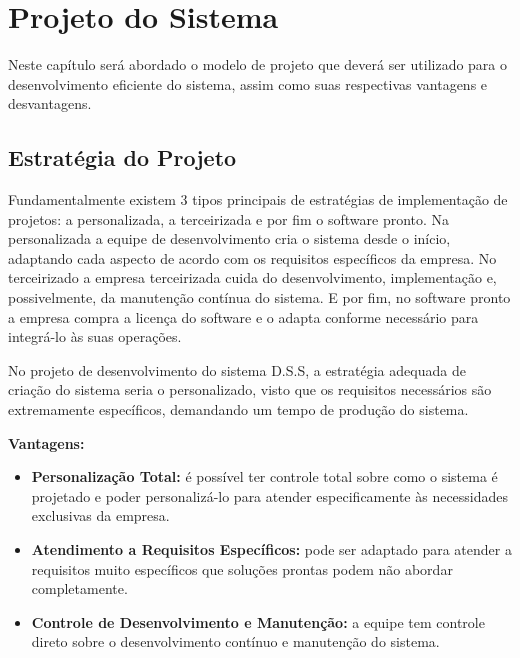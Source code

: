 
\chapter{Projeto do Sistema}

Neste capítulo será abordado o modelo de projeto que deverá ser utilizado para o desenvolvimento eficiente do sistema, assim como suas respectivas vantagens e desvantagens.


\section{Estrat\'{e}gia do Projeto}
Fundamentalmente existem 3 tipos principais de estratégias de implementação de projetos: a personalizada, a terceirizada e por fim o software pronto. Na personalizada a equipe de desenvolvimento cria o sistema desde o início, adaptando cada aspecto de acordo com os requisitos específicos da empresa. No terceirizado a empresa terceirizada cuida do desenvolvimento, implementação e, possivelmente, da manutenção contínua do sistema. E por fim, no software pronto a empresa compra a licença do software e o adapta conforme necessário para integrá-lo às suas operações.

No projeto de desenvolvimento do sistema D.S.S, a estratégia adequada de criação do sistema seria o personalizado, visto que os requisitos necessários são extremamente específicos, demandando um tempo de produção do sistema.

\textbf{Vantagens: }
\begin{itemize}
	\item \textbf{Personalização Total:} é possível ter controle total sobre como o sistema é projetado e poder personalizá-lo para atender especificamente às necessidades exclusivas da empresa.
	
	\item \textbf{Atendimento a Requisitos Específicos:} pode ser adaptado para atender a requisitos muito específicos que soluções prontas podem não abordar completamente.
	
	\item \textbf{Controle de Desenvolvimento e Manutenção:} a equipe tem controle direto sobre o desenvolvimento contínuo e manutenção do sistema.
\end{itemize}

